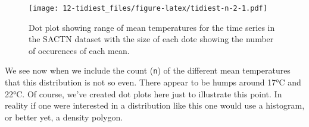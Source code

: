 \documentclass[]{book}
\newenvironment{Shaded}{\begin{snugshade}}{\end{snugshade}}
\newcommand{\KeywordTok}[1]{\textcolor[rgb]{0.13,0.29,0.53}{\textbf{#1}}}
\newcommand{\DataTypeTok}[1]{\textcolor[rgb]{0.13,0.29,0.53}{#1}}
\newcommand{\DecValTok}[1]{\textcolor[rgb]{0.00,0.00,0.81}{#1}}
\newcommand{\StringTok}[1]{\textcolor[rgb]{0.31,0.60,0.02}{#1}}
\newcommand{\OperatorTok}[1]{\textcolor[rgb]{0.81,0.36,0.00}{\textbf{#1}}}
\newcommand{\NormalTok}[1]{#1}
\theoremstyle{definition}
\theoremstyle{definition}
\theoremstyle{definition}
\theoremstyle{remark}
\begin{document}
\begin{Shaded}
\end{Shaded}

\begin{figure}
\centering
\texttt{[image: 12-tidiest\_files/figure-latex/tidiest-n-2-1.pdf]}
\caption{\label{fig:tidiest-n-2}Dot plot showing range of mean temperatures
for the time series in the SACTN dataset with the size of each dote
showing the number of occurences of each mean.}
\end{figure}

We see now when we include the count (\texttt{n}) of the different mean
temperatures that this distribution is not so even. There appear to be
humps around 17°C and 22°C. Of course, we've created dot plots here just
to illustrate this point. In reality if one were interested in a
distribution like this one would use a histogram, or better yet, a
density polygon.
\end{document}
